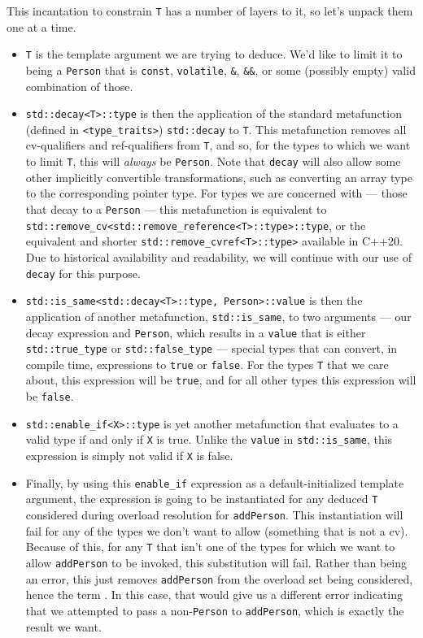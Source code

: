 \noindent This incantation to constrain \lstinline!T! has a number of layers to it,
so let's unpack them one at a time.
\begin{itemize}
\item{\lstinline!T! is the template argument we are trying to deduce. We’d like to limit it to being a \lstinline!Person! that is \lstinline!const!, \lstinline!volatile!, \lstinline!&!, \lstinline!&&!, or some (possibly empty) valid combination of those.}
\item{\lstinline!std::decay<T>::type! is then the application of the standard metafunction (defined in \lstinline!<type_traits>!) \lstinline!std::decay! to \lstinline!T!. This metafunction removes all cv-qualifiers and ref-qualifiers from \lstinline!T!, and so, for the types to which we want to limit \lstinline!T!, this will \emph{always} be \lstinline!Person!. Note that \lstinline!decay! will also allow some other implicitly convertible transformations, such as converting an array type to the corresponding pointer type. For types we are concerned with --- those that decay to a \lstinline!Person! --- this metafunction is equivalent to \lstinline!std::remove_cv<std::remove_reference<T>::type>::type!, or the equivalent and shorter \lstinline!std::remove_cvref<T>::type>! available in C++20. Due to historical availability and readability, we will continue with our use of \lstinline!decay! for this purpose.}
\item{\lstinline!std::is_same<std::decay<T>::type,!~\lstinline!Person>::value! is then the application of another metafunction, \lstinline!std::is_same!, to two arguments --- our decay expression and \lstinline!Person!, which results in a \lstinline!value! that is either \lstinline!std::true_type! or \lstinline!std::false_type! --- special types that can convert, in compile time, expressions to \lstinline!true! or \lstinline!false!. For the types \lstinline!T! that we care about, this expression will be \lstinline!true!, and for all other types this expression will be \lstinline!false!.}
\item{\lstinline!std::enable_if<X>::type! is yet another metafunction that evaluates to a valid type if and only if \lstinline!X! is true. Unlike the \lstinline!value! in \lstinline!std::is_same!, this expression is simply not valid if \lstinline!X! is false.}
\item{Finally, by using this \lstinline!enable_if! expression as a default-initialized template argument, the expression is going to be instantiated for any deduced \lstinline!T! considered during overload resolution for \lstinline!addPerson!. This instantiation will fail for any of the types we don’t want to allow (something that is not a cv). Because of this, for any \lstinline!T! that isn’t one of the types for which we want to allow \lstinline!addPerson! to be invoked, this substitution will fail. Rather than being an error, this just removes \lstinline!addPerson! from the overload set being considered, hence the term . In this case, that would give us a different error indicating that we attempted to pass a non-\lstinline!Person! to \lstinline!addPerson!, which is exactly the result we want.}
\end{itemize}
